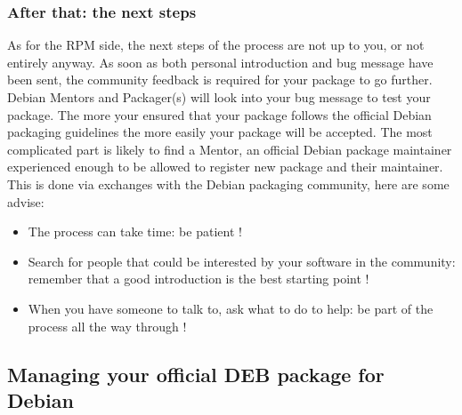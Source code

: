 \subsubsection{After that: the next steps}

As for the RPM side, the next steps of the process are not up to you, or not entirely anyway.
As soon as both personal introduction and bug message have been sent, the community feedback
is required for your package to go further. 
Debian Mentors and Packager(s) will look into your bug message to test your package. 
The more your ensured that your package follows the official Debian packaging guidelines
the more easily your package will be accepted.
The most complicated part is likely to find a Mentor, an official Debian package maintainer
experienced enough to be allowed to register new package and their maintainer. This is done
via exchanges with the Debian packaging community, here are some advise:
\begin{itemize}
\item The process can take time: be patient !
\item Search for people that could be interested by your software in the community: remember
that a good introduction is the best starting point !
\item When you have someone to talk to, ask what to do to help: be part of the process all the
way through !
\end{itemize}

\subsection{Managing your official DEB package for Debian}

